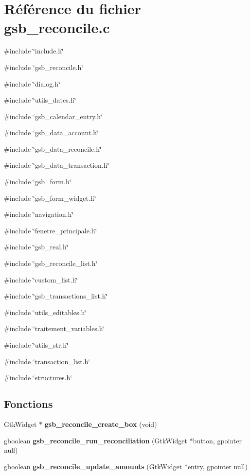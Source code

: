 \section{Référence du fichier gsb\_\-reconcile.c}
\label{gsb__reconcile_8c}
{\ttfamily \#include \char`\"{}include.h\char`\"{}}\par
{\ttfamily \#include \char`\"{}gsb\_\-reconcile.h\char`\"{}}\par
{\ttfamily \#include \char`\"{}dialog.h\char`\"{}}\par
{\ttfamily \#include \char`\"{}utils\_\-dates.h\char`\"{}}\par
{\ttfamily \#include \char`\"{}gsb\_\-calendar\_\-entry.h\char`\"{}}\par
{\ttfamily \#include \char`\"{}gsb\_\-data\_\-account.h\char`\"{}}\par
{\ttfamily \#include \char`\"{}gsb\_\-data\_\-reconcile.h\char`\"{}}\par
{\ttfamily \#include \char`\"{}gsb\_\-data\_\-transaction.h\char`\"{}}\par
{\ttfamily \#include \char`\"{}gsb\_\-form.h\char`\"{}}\par
{\ttfamily \#include \char`\"{}gsb\_\-form\_\-widget.h\char`\"{}}\par
{\ttfamily \#include \char`\"{}navigation.h\char`\"{}}\par
{\ttfamily \#include \char`\"{}fenetre\_\-principale.h\char`\"{}}\par
{\ttfamily \#include \char`\"{}gsb\_\-real.h\char`\"{}}\par
{\ttfamily \#include \char`\"{}gsb\_\-reconcile\_\-list.h\char`\"{}}\par
{\ttfamily \#include \char`\"{}custom\_\-list.h\char`\"{}}\par
{\ttfamily \#include \char`\"{}gsb\_\-transactions\_\-list.h\char`\"{}}\par
{\ttfamily \#include \char`\"{}utils\_\-editables.h\char`\"{}}\par
{\ttfamily \#include \char`\"{}traitement\_\-variables.h\char`\"{}}\par
{\ttfamily \#include \char`\"{}utils\_\-str.h\char`\"{}}\par
{\ttfamily \#include \char`\"{}transaction\_\-list.h\char`\"{}}\par
{\ttfamily \#include \char`\"{}structures.h\char`\"{}}\par
\subsection*{Fonctions}
\begin{DoxyCompactItemize}
\item 
GtkWidget $\ast$ {\bf gsb\_\-reconcile\_\-create\_\-box} (void)
\item 
gboolean {\bf gsb\_\-reconcile\_\-run\_\-reconciliation} (GtkWidget $\ast$button, gpointer null)
\item 
gboolean {\bf gsb\_\-reconcile\_\-update\_\-amounts} (GtkWidget $\ast$entry, gpointer null)
\end{DoxyCompactItemize}
